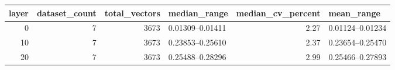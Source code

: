 \begin{tabular}{rrrlrl}
\toprule
layer & dataset_count & total_vectors & median_range & median_cv_percent & mean_range \\
\midrule
0 & 7 & 3673 & 0.01309--0.01411 & 2.27 & 0.01124--0.01234 \\
10 & 7 & 3673 & 0.23853--0.25610 & 2.37 & 0.23654--0.25470 \\
20 & 7 & 3673 & 0.25488--0.28296 & 2.99 & 0.25466--0.27893 \\
\bottomrule
\end{tabular}
